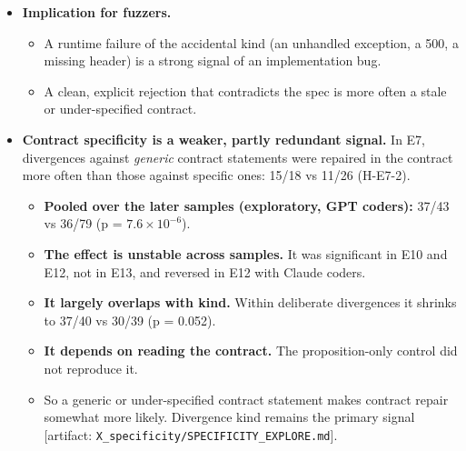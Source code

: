 \documentclass[acmsmall,screen,review,anonymous]{acmart}
\newcommand{\artifact}[1]{{\footnotesize [artifact: #1]}}
\begin{document}
\begin{itemize}
\begin{itemize}
\item So the kind is best read as an \emph{explanation} of repair direction, not as a triage method that beats LLMs.
\item The practical lesson: report LLM triage accuracy over many fixes and clusters, and use the divergence kind as an interpretable check on it.
\end{itemize}
\item \textbf{Implication for fuzzers.}
\begin{itemize}
\item A runtime failure of the accidental kind (an unhandled exception, a 500, a missing header) is a strong signal of an implementation bug.
\item A clean, explicit rejection that contradicts the spec is more often a stale or under-specified contract.
\end{itemize}
\item \textbf{Contract specificity is a weaker, partly redundant signal.} In E7, divergences against \emph{generic} contract statements were repaired in the contract more often than those against specific ones: 15/18 vs 11/26 (H-E7-2).
\begin{itemize}
\item \textbf{Pooled over the later samples (exploratory, GPT coders):} 37/43 vs 36/79 (p = $7.6 \times 10^{-6}$).
\item \textbf{The effect is unstable across samples.} It was significant in E10 and E12, not in E13, and reversed in E12 with Claude coders.
\item \textbf{It largely overlaps with kind.} Within deliberate divergences it shrinks to 37/40 vs 30/39 (p = 0.052).
\item \textbf{It depends on reading the contract.} The proposition-only control did not reproduce it.
\item So a generic or under-specified contract statement makes contract repair somewhat more likely. Divergence kind remains the primary signal \artifact{\texttt{X\_specificity/\allowbreak{}SPECIFICITY\_EXPLORE.md}}.
\end{itemize}
\end{itemize}
\end{document}
